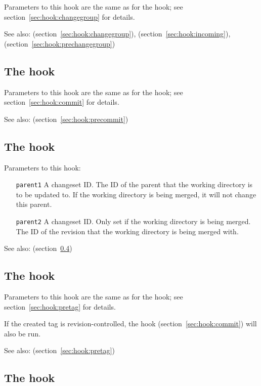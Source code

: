 Parameters to this hook are the same as for the 
hook; see section~\ref{sec:hook:changegroup} for details.

See also:  (section~\ref{sec:hook:changegroup}),
 (section~\ref{sec:hook:incoming}),
 (section~\ref{sec:hook:prechangegroup})

\subsection{The  hook}
\label{sec:hook:pretxncommit}

Parameters to this hook are the same as for the  hook;
see section~\ref{sec:hook:commit} for details.

See also:  (section~\ref{sec:hook:precommit})

\subsection{The  hook}
\label{sec:hook:preupdate}

Parameters to this hook:
\begin{itemize}
\item[\texttt{parent1}] A changeset ID.  The ID of the parent that the
  working directory is to be updated to.  If the working directory is
  being merged, it will not change this parent.
\item[\texttt{parent2}] A changeset ID.  Only set if the working
  directory is being merged.  The ID of the revision that the working
  directory is being merged with.
\end{itemize}

See also:  (section~\ref{sec:hook:update})

\subsection{The  hook}
\label{sec:hook:tag}

Parameters to this hook are the same as for the  hook;
see section~\ref{sec:hook:pretag} for details.

If the created tag is revision-controlled, the  hook
(section~\ref{sec:hook:commit}) will also be run.

See also:  (section~\ref{sec:hook:pretag})

\subsection{The  hook}
\label{sec:hook:update}

